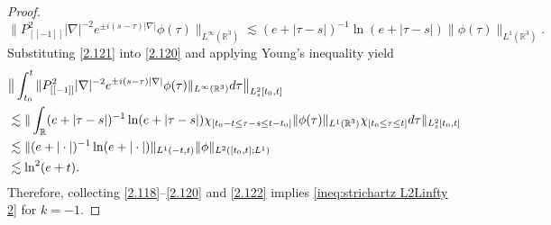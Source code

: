 \documentclass[11pt,twoside]{article}
\def\R{\mathop{\mathbb R\kern 0pt}\nolimits}
\def\ls{\lesssim}
\theoremstyle{plain}
\theoremstyle{definition}
\numberwithin{equation}{section}
\begin{document}
\begin{proof}
\begin{equation}
			\|P_{[[-1]]}^2|\nabla|^{-2} e^{\pm i(s-\tau)|\nabla|} \phi(\tau) \|_{L^\infty(\mathbb{R}^3)}\lesssim (e + |\tau-s|)^{-1} \ln(e+ |\tau-s|)\|\phi(\tau) \|_{L^{1}(\mathbb{R}^3)}.
		\end{equation}
		Substituting \eqref{2.121} into \eqref{2.120} and applying Young's inequality yield
		\begin{equation}\label{2.122}
			\begin{split}
				&\big\|\int_{t_0}^{t}
				\|P_{[[-1]]}^2 |\nabla|^{-2}e^{\pm i(s-\tau)|\nabla|} \phi(\tau) \|_{L^\infty(\mathbb{R}^3)} d\tau\big\|_{L^2_s[t_0,t]}\\
				&\ls \| \int_{\mathbb{R}}(e+|\tau-s|)^{-1}\ln(e+ |\tau-s|)\chi_{[t_0-t\le \tau-s\le t-t_0]}\|\phi(\tau)\|_{L^{1}{(\R^3)}}\chi_{[t_0\le\tau\le t]}d\tau\|_{L^2_s{[t_0,t]}}\\
				&\ls
				\|(e + |\cdot|)^{-1}\ln(e+ |\cdot|)\|_{L^{1}(-t,t)}\|\phi\|_{L^{2}([t_0,t];L^1)}\\
				&\ls
				\ln^2(e+t).
			\end{split}
		\end{equation}
		Therefore, collecting \eqref{2.118}--\eqref{2.120} and \eqref{2.122} implies \eqref{ineq:strichartz L2Linfty 2} for $k = -1$.
	\end{proof}
\end{document}
